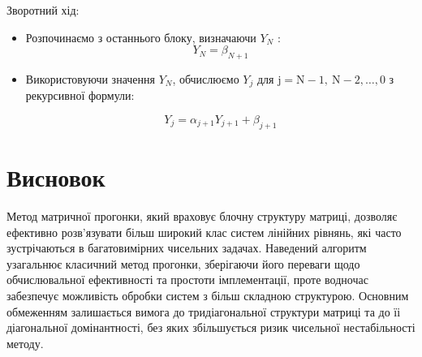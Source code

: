 \vspace{1cm}

Зворотний хід:
\begin{itemize}
    \item Розпочинаємо з останнього блоку, визначаючи $Y_{N}$ :
    $$
    Y_{N}=\beta_{N+1}
    $$
    \item Використовуючи значення $Y_{N}$, обчислюємо $Y_{j}$ для $\mathrm{j}=\mathrm{N}-1, \mathrm{~N}-2, \ldots, 0$ з рекурсивної формули:

    $$
    Y_{j}=\alpha_{j+1} Y_{j+1}+\beta_{j+1}
    $$

\end{itemize}

\section{Висновок}
Метод матричної прогонки, який враховує блочну структуру матриці, дозволяє ефективно розв'язувати більш широкий клас систем лінійних рівнянь, які часто зустрічаються в багатовимірних чисельних задачах. Наведений алгоритм узагальнює класичний метод прогонки, зберігаючи його переваги щодо обчислювальної ефективності та простоти імплементації, проте водночас забезпечує можливість обробки систем з більш складною структурою. Основним обмеженням залишається вимога до тридіагональної структури матриці та до їі діагональної домінантності, без яких збільшується ризик чисельної нестабільності методу.